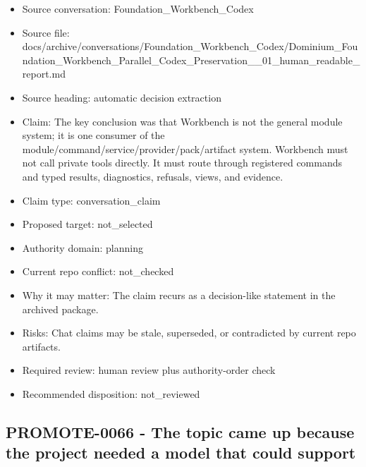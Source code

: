 \documentclass[11pt,a4paper]{report}
\begin{document}
\begin{itemize}
\item Source conversation: Foundation\_Workbench\_Codex
\item Source file: docs/archive/conversations/Foundation\_Workbench\_Codex/Dominium\_Foundation\_Workbench\_Parallel\_Codex\_Preservation\_\_01\_human\_readable\_report.md
\item Source heading: automatic decision extraction
\item Claim: The key conclusion was that Workbench is not the general module system; it is one consumer of the module/command/service/provider/pack/artifact system. Workbench must not call private tools directly. It must route through registered commands and typed results, diagnostics, refusals, views, and evidence.
\item Claim type: conversation\_claim
\item Proposed target: not\_selected
\item Authority domain: planning
\item Current repo conflict: not\_checked
\item Why it may matter: The claim recurs as a decision-like statement in the archived package.
\item Risks: Chat claims may be stale, superseded, or contradicted by current repo artifacts.
\item Required review: human review plus authority-order check
\item Recommended disposition: not\_reviewed
\end{itemize}

\subsection{PROMOTE-0066 - The topic came up because the project needed a model that could support}
\end{document}
